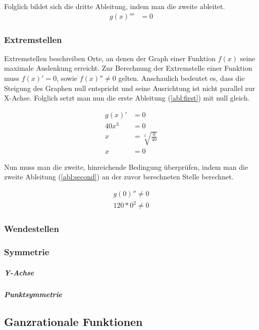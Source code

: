 \documentclass[a4paper]{article}
\begin{document}
				Folglich bildet sich die dritte Ableitung, indem man die zweite ableitet.
				\begin{equation}
					\begin{split}
						g(x)''' &= 0
					\end{split}
				\end{equation}
				
			\subsubsection{Extremstellen}
				Extremstellen beschreiben Orte, an denen der Graph einer Funktion $f(x)$ seine maximale Auslenkung erreicht. Zur Berechnung der Extremstelle einer Funktion muss $f(x)' = 0$, sowie $f(x)'' \neq 0$ gelten. Anschaulich bedeutet es, dass die Steigung des Graphen null entspricht und seine Ausrichtung ist nicht parallel zur X-Achse.
				Folglich setzt man nun die erste Ableitung (\ref{abl:first}) mit null gleich.
				
				\begin{equation}
					\begin{split}
						g(x)' &= 0\\
						40 x^3 &= 0\\
						x &= \sqrt[3]{\frac{0}{40}}\\
						x &= 0
					\end{split}
				\end{equation}
				
				Nun muss man die zweite, hinreichende Bedingung überprüfen, indem man die zweite Ableitung (\ref{abl:second}) an der zuvor berechneten Stelle berechnet.
				
				\begin{equation}
					\begin{split}
						g(0)'' \neq 0\\
						120 *0^2 \neq 0
					\end{split}
				\end{equation}
				
				
			\subsubsection{Wendestellen}
			\subsubsection{Symmetrie}
				\subparagraph{Y-Achse}
				\subparagraph{Punktsymmetrie}
		\subsection{Ganzrationale Funktionen}
\end{document}
